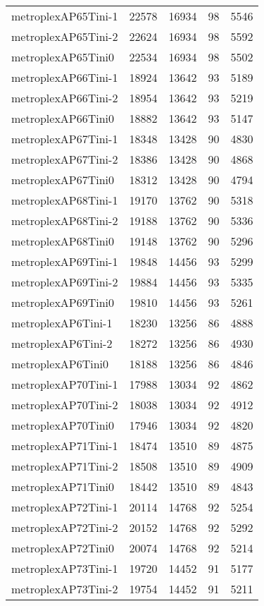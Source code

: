 \begin{tabular}{lrrrr}
metroplexAP65Tini-1 & 22578 & 16934 & 98 & 5546 \\
metroplexAP65Tini-2 & 22624 & 16934 & 98 & 5592 \\
metroplexAP65Tini0 & 22534 & 16934 & 98 & 5502 \\
metroplexAP66Tini-1 & 18924 & 13642 & 93 & 5189 \\
metroplexAP66Tini-2 & 18954 & 13642 & 93 & 5219 \\
metroplexAP66Tini0 & 18882 & 13642 & 93 & 5147 \\
metroplexAP67Tini-1 & 18348 & 13428 & 90 & 4830 \\
metroplexAP67Tini-2 & 18386 & 13428 & 90 & 4868 \\
metroplexAP67Tini0 & 18312 & 13428 & 90 & 4794 \\
metroplexAP68Tini-1 & 19170 & 13762 & 90 & 5318 \\
metroplexAP68Tini-2 & 19188 & 13762 & 90 & 5336 \\
metroplexAP68Tini0 & 19148 & 13762 & 90 & 5296 \\
metroplexAP69Tini-1 & 19848 & 14456 & 93 & 5299 \\
metroplexAP69Tini-2 & 19884 & 14456 & 93 & 5335 \\
metroplexAP69Tini0 & 19810 & 14456 & 93 & 5261 \\
metroplexAP6Tini-1 & 18230 & 13256 & 86 & 4888 \\
metroplexAP6Tini-2 & 18272 & 13256 & 86 & 4930 \\
metroplexAP6Tini0 & 18188 & 13256 & 86 & 4846 \\
metroplexAP70Tini-1 & 17988 & 13034 & 92 & 4862 \\
metroplexAP70Tini-2 & 18038 & 13034 & 92 & 4912 \\
metroplexAP70Tini0 & 17946 & 13034 & 92 & 4820 \\
metroplexAP71Tini-1 & 18474 & 13510 & 89 & 4875 \\
metroplexAP71Tini-2 & 18508 & 13510 & 89 & 4909 \\
metroplexAP71Tini0 & 18442 & 13510 & 89 & 4843 \\
metroplexAP72Tini-1 & 20114 & 14768 & 92 & 5254 \\
metroplexAP72Tini-2 & 20152 & 14768 & 92 & 5292 \\
metroplexAP72Tini0 & 20074 & 14768 & 92 & 5214 \\
metroplexAP73Tini-1 & 19720 & 14452 & 91 & 5177 \\
metroplexAP73Tini-2 & 19754 & 14452 & 91 & 5211 \\

\end{tabular}
